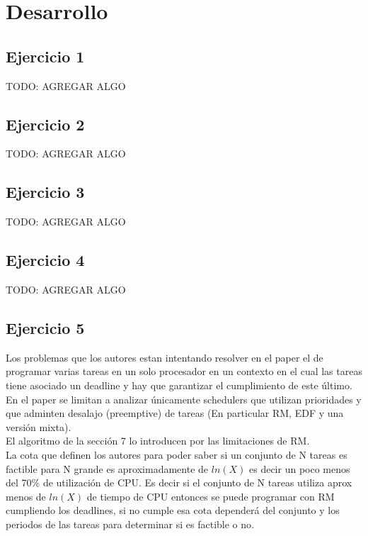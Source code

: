 \section{Desarrollo}

\subsection{Ejercicio 1}
TODO: AGREGAR ALGO

\subsection{Ejercicio 2}
TODO: AGREGAR ALGO

\subsection{Ejercicio 3}
TODO: AGREGAR ALGO

\subsection{Ejercicio 4}
TODO: AGREGAR ALGO

\subsection{Ejercicio 5}

Los problemas que los autores estan intentando resolver en el paper el de programar varias tareas en un solo procesador en un contexto en el cual las tareas tiene asociado un deadline y hay que garantizar el cumplimiento de este último. \\

En el paper se limitan a analizar únicamente schedulers que utilizan prioridades y que adminten desalajo (preemptive) de tareas (En particular RM, EDF y una versión mixta).\\


El algoritmo de la sección 7 lo introducen por las limitaciones de RM.\\


La cota que definen los autores para poder saber si un conjunto de N tareas es factible para N grande es aproximadamente de $ln(X)$ es decir un poco menos del 70\% de utilización de CPU.
Es decir si el conjunto de N tareas utiliza aprox menos de $ln(X)$ de tiempo de CPU entonces se puede programar con RM cumpliendo los deadlines, si no cumple esa cota dependerá del conjunto y los periodos de las tareas para determinar si es factible o no. \\


